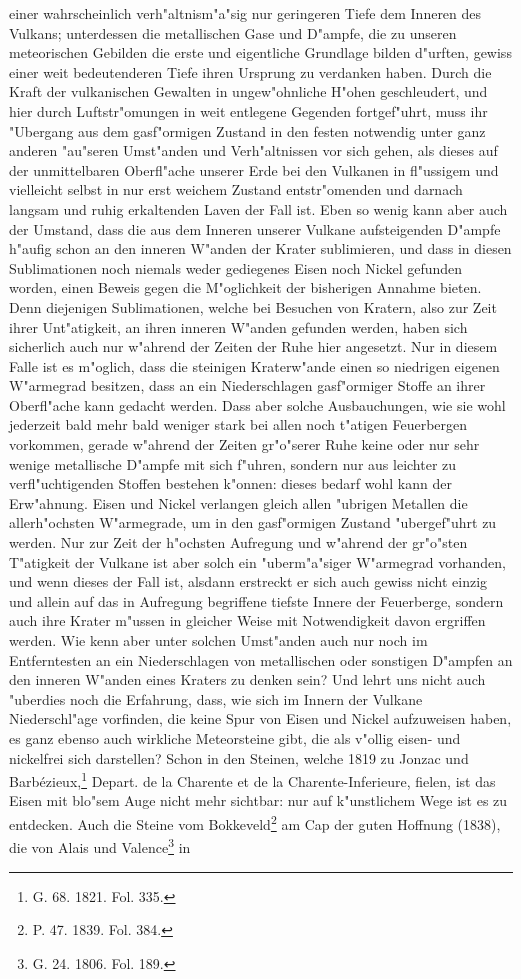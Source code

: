 \documentclass[a4paper, 8pt, oneside, polutonikogreek, german]{article}
\begin{document}
einer wahrscheinlich verh"altnism"a"sig nur geringeren Tiefe dem Inneren des Vulkans; unterdessen die metallischen Gase und D"ampfe, die zu unseren meteorischen Gebilden die erste und eigentliche Grundlage bilden d"urften, gewiss einer weit bedeutenderen Tiefe ihren Ursprung zu verdanken haben. Durch die Kraft der vulkanischen Gewalten in ungew"ohnliche H"ohen geschleudert, und hier durch Luftstr"omungen in weit entlegene Gegenden fortgef"uhrt, muss ihr "Ubergang aus dem gasf"ormigen Zustand in den festen notwendig unter ganz anderen "au"seren Umst"anden und Verh"altnissen vor sich gehen, als dieses auf der unmittelbaren Oberfl"ache unserer Erde bei den Vulkanen in fl"ussigem und vielleicht selbst in nur erst weichem Zustand entstr"omenden und darnach langsam und ruhig erkaltenden Laven der Fall ist. Eben so wenig kann aber auch der Umstand, dass die aus dem Inneren unserer Vulkane aufsteigenden D"ampfe h"aufig schon an den inneren W"anden der Krater sublimieren, und dass in diesen Sublimationen noch niemals weder gediegenes Eisen noch Nickel gefunden worden, einen Beweis gegen die M"oglichkeit der bisherigen Annahme bieten. Denn diejenigen Sublimationen, welche bei Besuchen von Kratern, also zur Zeit ihrer Unt"atigkeit, an ihren inneren W"anden gefunden werden, haben sich sicherlich auch nur w"ahrend der Zeiten der Ruhe hier angesetzt. Nur in diesem Falle ist es m"oglich, dass die steinigen Kraterw"ande einen so niedrigen eigenen W"armegrad besitzen, dass an ein Niederschlagen gasf"ormiger Stoffe an ihrer Oberfl"ache kann gedacht werden. Dass aber solche Ausbauchungen, wie sie wohl jederzeit bald mehr bald weniger stark bei allen noch t"atigen Feuerbergen vorkommen, gerade w"ahrend der Zeiten gr"o"serer Ruhe keine oder nur sehr wenige metallische D"ampfe mit sich f"uhren, sondern nur aus leichter zu verfl"uchtigenden Stoffen bestehen k"onnen: dieses bedarf wohl kann der Erw"ahnung. Eisen und Nickel verlangen gleich allen "ubrigen Metallen die allerh"ochsten W"armegrade, um in den gasf"ormigen Zustand "ubergef"uhrt zu werden. Nur zur Zeit der h"ochsten Aufregung und w"ahrend der gr"o"sten T"atigkeit der Vulkane ist aber solch ein "uberm"a"siger W"armegrad vorhanden, und wenn dieses der Fall ist, alsdann erstreckt er sich auch gewiss nicht einzig und allein auf das in Aufregung begriffene tiefste Innere der Feuerberge, sondern auch ihre Krater m"ussen in gleicher Weise mit Notwendigkeit davon ergriffen werden. Wie kenn aber unter solchen Umst"anden auch nur noch im Entferntesten an ein Niederschlagen von metallischen oder sonstigen D"ampfen an den inneren W"anden eines Kraters zu denken sein? Und lehrt uns nicht auch "uberdies noch die Erfahrung, dass, wie sich im Innern der Vulkane Niederschl"age vorfinden, die keine Spur von Eisen und Nickel aufzuweisen haben, es ganz ebenso auch wirkliche Meteorsteine gibt, die als v"ollig eisen- und nickelfrei sich darstellen? Schon in den Steinen, welche 1819 zu Jonzac und Barbézieux,\footnote{G. 68. 1821. Fol. 335.} Depart. de la Charente et de la Charente-Inferieure, fielen, ist das Eisen mit blo"sem Auge nicht mehr sichtbar: nur auf k"unstlichem Wege ist es zu entdecken. Auch die Steine vom Bokkeveld\footnote{P. 47. 1839. Fol. 384.} am Cap der guten Hoffnung (1838), die von Alais und Valence\footnote{G. 24. 1806. Fol. 189.} in 
\end{document}
